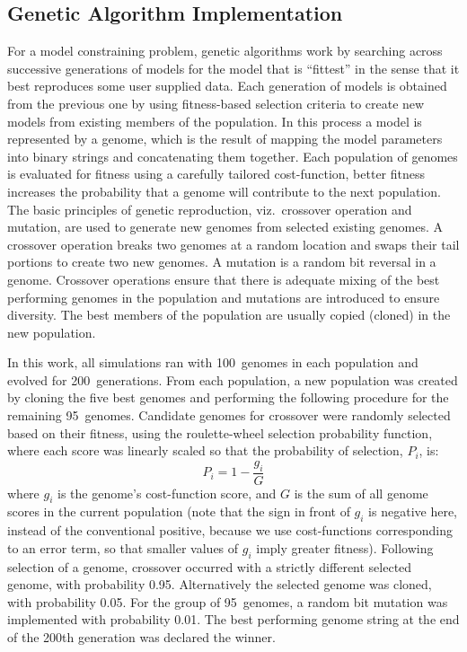 \subsection{Genetic Algorithm Implementation }

For a model constraining problem, genetic algorithms work by searching
across successive generations of models for the model that is
``fittest'' in the sense that it best reproduces some user supplied
data. Each generation of models is obtained from the previous one by
using fitness-based selection criteria to create new models from
existing members of the population. In this process a model is
represented by a genome, which is the result of mapping the model
parameters into binary strings and concatenating them together. Each
population of genomes is evaluated for fitness using a carefully
tailored cost-function, better fitness increases the probability that
a genome will contribute to the next population.  The basic principles
of genetic reproduction, viz.\ crossover operation and mutation, are
used to generate new genomes from selected existing genomes. A
crossover operation breaks two genomes at a random location and swaps
their tail portions to create two new genomes. A mutation is a random
bit reversal in a genome. Crossover operations ensure that there is
adequate mixing of the best performing genomes in the population and
mutations are introduced to ensure diversity. The best members of the
population are usually copied (cloned) in the new population.

\smallskip{} 

In this work, all {\GA} simulations ran with 100~genomes in each
population and evolved for 200~generations. From each population, a
new population was created by cloning the five best genomes and
performing the following procedure for the remaining 95~genomes.
Candidate genomes for crossover were randomly selected based on their
fitness, using the roulette-wheel selection probability function,
where each score was linearly scaled so that the probability of
selection, $P_i$, is:
\begin{equation} \label{eq:GA:1} 
P_{i} =1 - \frac{g_{i} }{G}
\end{equation}
\noindent where $g_i$ is the genome's cost-function score, and $G$ is
the sum of all genome scores in the current population (note that the
sign in front of $g_i$ is negative here, instead of the conventional
positive, because we use cost-functions corresponding to an error
term, so that smaller values of $g_i$ imply greater
fitness). Following selection of a genome, crossover occurred with a
strictly different selected genome, with probability 0.95.
Alternatively the selected genome was cloned, with probability 0.05.
For the group of 95~genomes, a random bit mutation was implemented
with probability 0.01. The best performing genome string at the end of
the 200th generation was declared the winner.

